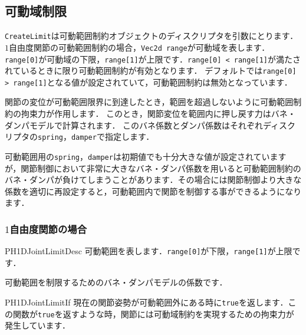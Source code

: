 \subsection*{\KLUDGE 可動域制限}

\texttt{CreateLimit}\KLUDGE は可動範囲制約オブジェクトのディスクリプタを引数にとります．
$1$\KLUDGE 自由度関節の可動範囲制約の場合，\texttt{Vec2d range}\KLUDGE が可動域を表します．\texttt{range[0]}\KLUDGE が可動域の下限，\texttt{range[1]}\KLUDGE が上限です．\texttt{range[0] < range[1]}\KLUDGE が満たされているときに限り可動範囲制約が有効となります．
\KLUDGE デフォルトでは\texttt{range[0] > range[1]}\KLUDGE となる値が設定されていて，可動範囲制約は無効となっています．

\KLUDGE 関節の変位が可動範囲限界に到達したとき，範囲を超過しないように可動範囲制約の拘束力が作用します．
\KLUDGE このとき，関節変位を範囲内に押し戻す力はバネ・ダンパモデルで計算されます．
\KLUDGE このバネ係数とダンパ係数はそれぞれディスクリプタの\texttt{spring}\KLUDGE ，\texttt{damper}\KLUDGE で指定します．

\begin{tips}
\KLUDGE 可動範囲用の\texttt{spring}\KLUDGE ，\texttt{damper}\KLUDGE は初期値でも十分大きな値が設定されていますが，関節制御において非常に大きなバネ・ダンパ係数を用いると可動範囲制約のバネ・ダンパが負けてしまうことがあります．その場合には関節制御より大きな係数を適切に再設定すると，可動範囲内で関節を制御する事ができるようになります．
\end{tips}


\subsubsection*{$1$\KLUDGE 自由度関節の場合}

\begin{reference}{PH1DJointLimitDesc}
\KLUDGE 可動範囲を表します．\texttt{range[0]}\KLUDGE が下限，\texttt{range[1]}\KLUDGE が上限です．

 \Plus
{}
\KLUDGE 可動範囲を制限するためのバネ・ダンパモデルの係数です．
\end{reference}

\begin{reference}{PH1DJointLimitIf}
\KLUDGE 現在の関節姿勢が可動範囲外にある時に\texttt{true}\KLUDGE を返します．この関数が\texttt{true}\KLUDGE を返すような時，関節には可動域制約を実現するための拘束力が発生しています．
\end{reference}


